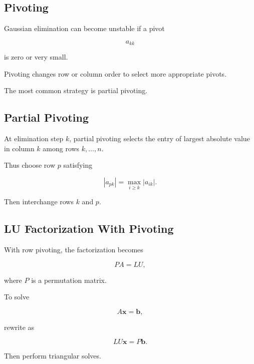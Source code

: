 \subsection{Pivoting}
\label{subsec:numerical-pivoting}

Gaussian elimination can become unstable if a pivot

\[
a_{kk}
\]

is zero or very small.

Pivoting changes row or column order to select more appropriate pivots.

The most common strategy is partial pivoting.

\subsection{Partial Pivoting}
\label{subsec:partial-pivoting}

At elimination step \(k\), partial pivoting selects the entry of largest
absolute value in column \(k\) among rows \(k,\ldots,n\).

Thus choose row \(p\) satisfying

\[
\boxed{
|a_{pk}|
=
\max_{i\geq k}
|a_{ik}|.
}
\]

Then interchange rows \(k\) and \(p\).

\subsection{LU Factorization With Pivoting}
\label{subsec:lu-with-pivoting}

With row pivoting, the factorization becomes

\[
\boxed{
PA
=
LU,
}
\]

where \(P\) is a permutation matrix.

To solve

\[
A\mathbf{x}
=
\mathbf{b},
\]

rewrite as

\[
LU\mathbf{x}
=
P\mathbf{b}.
\]

Then perform triangular solves.

